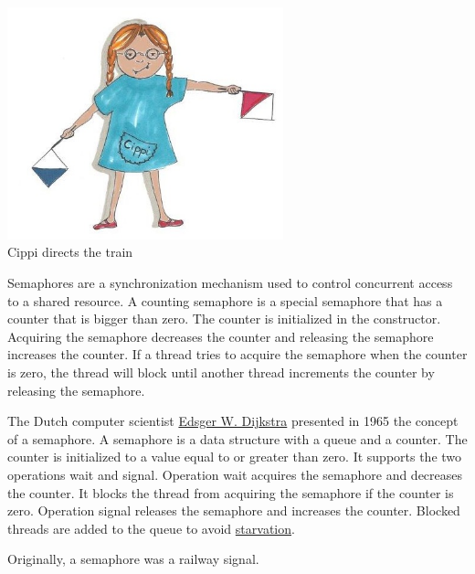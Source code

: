 \begin{center}
\includegraphics[width=0.6\textwidth]{content/3/chapter6/images/15.png}\\
Cippi directs the train
\end{center}

Semaphores are a synchronization mechanism used to control concurrent access to a shared resource. A counting semaphore is a special semaphore that has a counter that is bigger than zero. The counter is initialized in the constructor. Acquiring the semaphore decreases the counter and releasing the semaphore increases the counter. If a thread tries to acquire the semaphore when the counter is zero, the thread will block until another thread increments the counter by releasing the semaphore.


\begin{tcolorbox}[breakable,enhanced jigsaw,colback=blue!5!white,colframe=blue!75!black,title={Edsger W. Dijkstra invented Semaphores}]
	
The Dutch computer scientist \href{https://en.wikipedia.org/wiki/Edsger_W._Dijkstra}{Edsger W. Dijkstra} presented in 1965 the concept of a semaphore. A semaphore is a data structure with a queue and a counter. The counter is initialized to a value equal to or greater than zero. It supports the two operations wait and signal. Operation wait acquires the semaphore and decreases the counter. It blocks the thread from acquiring the semaphore if the counter is zero. Operation signal releases the semaphore and increases the counter. Blocked threads are added to the queue to avoid \href{https://en.wikipedia.org/wiki/Starvation_(computer_science)}{starvation}.

Originally, a semaphore was a railway signal.
	
\end{tcolorbox}

